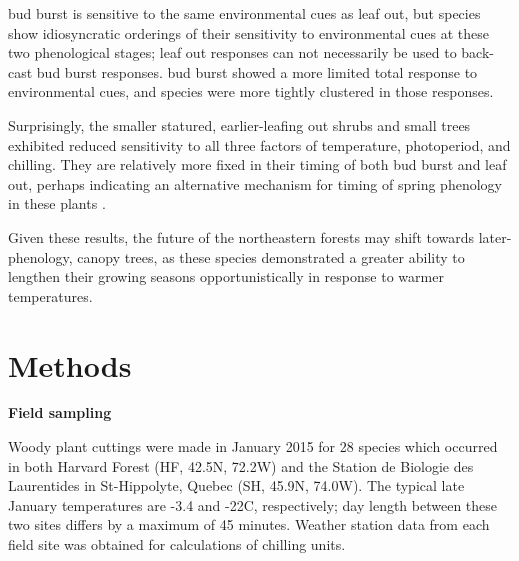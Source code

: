 \documentclass[11pt]{article}
\begin{document}
bud burst is sensitive to the same environmental cues as leaf out, but species show idiosyncratic orderings of their sensitivity to environmental cues at these two phenological stages; leaf out responses can not necessarily be used to back-cast bud burst responses. bud burst showed a more limited total response to environmental cues, and species were more tightly clustered in those responses.

Surprisingly, the smaller statured, earlier-leafing out shrubs and small trees exhibited reduced sensitivity to all three factors of temperature, photoperiod, and chilling. They are relatively more fixed in their timing of both bud burst and leaf out, perhaps indicating an alternative mechanism for timing of spring phenology in these plants \cite{Pagter:2015}.

Given these results, the future of the northeastern forests may shift towards later-phenology, canopy trees, as these species demonstrated a greater ability to lengthen their growing seasons opportunistically in response to warmer temperatures.

\section*{Methods}
\textbf{Field sampling}

Woody plant cuttings were made in January 2015 for 28 species which occurred in both Harvard Forest (HF, 42.5\degree N, 72.2\degree W) and the Station de Biologie des Laurentides in St-Hippolyte, Quebec (SH, 45.9\degree N, 74.0\degree W). The typical late January temperatures are -3.4 and -22\degree C, respectively; day length between these two sites differs by a maximum of 45 minutes. Weather station data from each field site was obtained for calculations of chilling units. 
\end{document}
